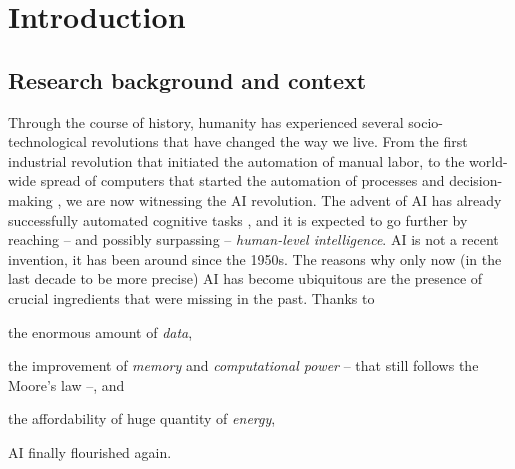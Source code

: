 
\chapter{Introduction}
\label{ch:introduction}
\mtcaddchapter
\minitoc

\begin{refsection}

\section{Research background and context}
\label{sec:research-background-and-context}
%
Through the course of history, humanity has experienced several socio-technological revolutions that have changed the way we live.
%
From the first industrial revolution that initiated the automation of manual labor, to the world-wide spread of computers that started the automation of processes and decision-making , we are now witnessing the \gls{AI} revolution.
%
The advent of \gls{AI} has already successfully automated cognitive tasks , and it is expected to go further by reaching -- and possibly surpassing -- \emph{human-level intelligence}.
%
\Gls{AI} is not a recent invention, it has been around since the 1950s.
%
The reasons why only now (in the last decade to be more precise) \gls{AI} has become ubiquitous are the presence of crucial ingredients that were missing in the past.
%
Thanks to
%
\begin{inlinelist}
    \item the enormous amount of \emph{data},
    \item the improvement of \emph{memory} and \emph{computational power} -- that still follows the Moore's law --, and
    \item the affordability of huge quantity of \emph{energy},
\end{inlinelist}
%
\gls{AI} finally flourished again.



\end{refsection}
